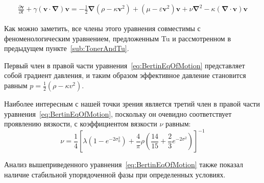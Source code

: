 		\begin{multline}
		\label{eq:BertinEqOfMotion}
			\frac{\partial \boldsymbol{v}}{\partial t} + \gamma(\boldsymbol{v} \cdot \boldsymbol{\nabla}) \boldsymbol{v} = -\frac{1}{2} \boldsymbol{\nabla} (\rho - \kappa \boldsymbol{v}^2) + (\mu - \varepsilon \boldsymbol{v}^2) \boldsymbol{v} + \nu \boldsymbol{\nabla}^2 - \kappa (\boldsymbol{\nabla} \cdot \boldsymbol{v}) \boldsymbol{v}
		\end{multline}

		Как можно заметить, все члены этого уравнения совместимы с феноменологическим уравнением, предложенным Tu и рассмотренном в предыдущем пункте~\ref{sub:TonerAndTu}.

		Первый член в правой части уравнения~\ref{eq:BertinEqOfMotion} представляет собой градиент давления, и таким образом эффективное давление становится равным $p = \frac{1}{2}(\rho - \kappa v^2)$.

		Наиболее интересным с нашей точки зрения является третий член в правой части уравнения~\ref{eq:BertinEqOfMotion}, поскольку он очевидно соответствует проявлению вязкости, с коэффициентом вязкости $\nu$ равным:
		\begin{equation}
		\label{eq:BertinViscosityCoefficient}
			\nu = \frac{1}{4}[\lambda (1-e^{-2 \sigma_0^2}) + \frac{4}{\pi}\rho(\frac{14}{15} + \frac{2}{3}e^{-2 \sigma^2})]^{-1}
		\end{equation}

		Анализ вышеприведенного уравнения~\ref{eq:BertinEqOfMotion} также показал наличие стабильной упорядоченной фазы при определенных условиях.

